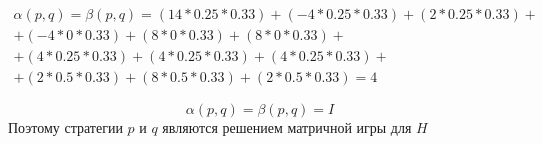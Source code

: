 \documentclass[a4paper,14pt]{extreport}
\begin{document}
\begin{equation}
\begin{split}
    \alpha(p, q) = \beta(p, q) = (14*0.25*0.33) + (-4*0.25*0.33) + (2*0.25*0.33) + \\
    + (-4*0*0.33) + (8*0*0.33) + (8*0*0.33) + \\
    + (4*0.25*0.33) + (4*0.25*0.33) + (4*0.25*0.33) + \\ + (2*0.5*0.33) + (8*0.5*0.33) + (2*0.5*0.33) = 4
\end{split}
\end{equation}

\begin{equation}
    \alpha(p, q) = \beta(p, q) = I
\end{equation}
Поэтому стратегии $p$ и $q$ являются решением матричной игры для $H$
\end{document}
